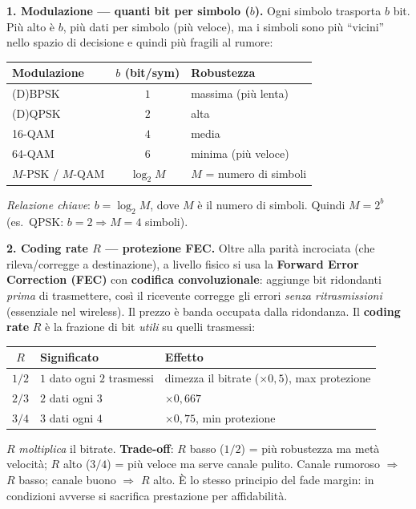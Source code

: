 \documentclass[11pt,a4paper]{report}
\begin{document}
\textbf{1. Modulazione --- quanti bit per simbolo ($b$).} Ogni simbolo trasporta $b$ bit. Più alto è $b$, più dati per simbolo (più veloce), ma i simboli sono più ``vicini'' nello spazio di decisione e quindi più fragili al rumore:
\begin{center}\footnotesize
\begin{tabular}{lcl}
\textbf{Modulazione} & $b$ (bit/sym) & \textbf{Robustezza} \\\hline
(D)BPSK & $1$ & massima (più lenta) \\
(D)QPSK & $2$ & alta \\
16-QAM & $4$ & media \\
64-QAM & $6$ & minima (più veloce) \\
$M$-PSK / $M$-QAM & $\log_2 M$ & $M$ = numero di simboli \\
\end{tabular}
\end{center}
\emph{Relazione chiave}: $b = \log_2 M$, dove $M$ è il numero di simboli. Quindi $M = 2^b$ (es.\ QPSK: $b=2 \Rightarrow M=4$ simboli).

\textbf{2. Coding rate $R$ --- protezione FEC.} Oltre alla parità incrociata (che rileva/corregge a destinazione), a livello fisico si usa la \textbf{Forward Error Correction (FEC)} con \textbf{codifica convoluzionale}: aggiunge bit ridondanti \emph{prima} di trasmettere, così il ricevente corregge gli errori \emph{senza ritrasmissioni} (essenziale nel wireless). Il prezzo è banda occupata dalla ridondanza. Il \textbf{coding rate} $R$ è la frazione di bit \emph{utili} su quelli trasmessi:
\begin{center}\footnotesize
\begin{tabular}{cll}
$R$ & \textbf{Significato} & \textbf{Effetto} \\\hline
$1/2$ & $1$ dato ogni $2$ trasmessi & dimezza il bitrate ($\times 0{,}5$), max protezione \\
$2/3$ & $2$ dati ogni $3$ & $\times 0{,}667$ \\
$3/4$ & $3$ dati ogni $4$ & $\times 0{,}75$, min protezione \\
\end{tabular}
\end{center}
$R$ \emph{moltiplica} il bitrate. \textbf{Trade-off}: $R$ basso ($1/2$) = più robustezza ma metà velocità; $R$ alto ($3/4$) = più veloce ma serve canale pulito. Canale rumoroso $\Rightarrow$ $R$ basso; canale buono $\Rightarrow$ $R$ alto. È lo stesso principio del fade margin: in condizioni avverse si sacrifica prestazione per affidabilità.
\end{document}
